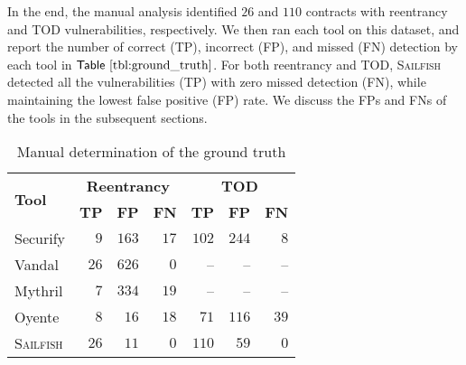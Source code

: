 \documentclass[conference, romanappendices]{tex/IEEEtran}
\theoremstyle{bfnote}
\newcommand{\toolname}{\textsc{Sailfish}\xspace}
\newcommand{\oyente}{{\sc Oyente}\xspace}
\newcommand{\securify}{{\sc Securify}\xspace}
\newcommand{\vandal}{{\sc Vandal}\xspace}
\newcommand{\reentrancy}{{reentrancy}\xspace}
\newcommand{\mythril}{{\sc Mythril}\xspace}
\newcommand{\Tbl}[1]{\ensuremath{\sf Table~\ref{#1}}}
\newcommand{\groundTruthDAO}{26}
\newcommand{\groundTruthTOD}{110}
\newcommand{\securifyTPDAO}{9}
\newcommand{\securifyFPDAO}{163}
\newcommand{\securifyFNDAO}{17}
\newcommand{\securifyTPTOD}{102}
\newcommand{\securifyFPTOD}{244}
\newcommand{\securifyFNTOD}{8}
\newcommand{\vandalTPDAO}{26}
\newcommand{\vandalFPDAO}{626}
\newcommand{\vandalFNDAO}{0}
\newcommand{\vandalTPTOD}{--}
\newcommand{\vandalFPTOD}{--}
\newcommand{\vandalFNTOD}{--}
\newcommand{\mythrilTPDAO}{7}
\newcommand{\mythrilFPDAO}{334}
\newcommand{\mythrilFNDAO}{19}
\newcommand{\mythrilTPTOD}{--}
\newcommand{\mythrilFPTOD}{--}
\newcommand{\mythrilFNTOD}{--}
\newcommand{\oyenteTPDAO}{8}
\newcommand{\oyenteFPDAO}{16}
\newcommand{\oyenteFNDAO}{18}
\newcommand{\oyenteTPTOD}{71}
\newcommand{\oyenteFPTOD}{116}
\newcommand{\oyenteFNTOD}{39}
\newcommand{\clintTPDAO}{26}
\newcommand{\clintFPDAO}{11}
\newcommand{\clintFNDAO}{0}
\newcommand{\clintTPTOD}{110}
\newcommand{\clintFPTOD}{59}
\newcommand{\clintFNTOD}{0}
\begin{document}
In the end, the manual analysis identified $\groundTruthDAO$ and $\groundTruthTOD$ contracts with \reentrancy and {TOD\EndAccSupp{}} vulnerabilities, respectively.
We then ran each tool on this dataset, and report the number of correct (TP), incorrect (FP), and missed (FN) detection by each tool in \Tbl{tbl:ground_truth}.
For both \reentrancy and {TOD\EndAccSupp{}}, \toolname detected all the vulnerabilities (TP) with zero missed detection (FN), while maintaining the lowest false positive (FP) rate.
We discuss the FPs and FNs of the tools in the subsequent sections.


\begin{table}[t]
	\centering
	\scriptsize
	\begin{tabular}{l|rrr|rrr}
		\toprule
		\multirow{2}{*}{\textbf{Tool}} & \multicolumn{3}{c|}{\textbf{Reentrancy}} & \multicolumn{3}{c}{\textbf{TOD}} \\ 
		\cline{2-7} 
		& \multicolumn{1}{c}{\textbf{TP}}& \textbf{FP} & \multicolumn{1}{c|}{\textbf{FN}} 
		& \multicolumn{1}{c}{\textbf{TP}} & \multicolumn{1}{c}{\textbf{FP}} & \multicolumn{1}{c}{\textbf{FN}} \\ 
		\midrule
		\rowcolor{black!10}	\securify & $\securifyTPDAO$ & $\securifyFPDAO$ & $\securifyFNDAO$ & $\securifyTPTOD$ & $\securifyFPTOD$ & $\securifyFNTOD$ \\
		\vandal & $\vandalTPDAO$ & $\vandalFPDAO$ & $\vandalFNDAO$ & \vandalTPTOD & \vandalFPTOD & \vandalFNTOD \\
		\rowcolor{black!10} \mythril & $\mythrilTPDAO$ & $\mythrilFPDAO$ & $\mythrilFNDAO$ & \mythrilTPTOD & \mythrilFPTOD & \mythrilFNTOD \\
		\oyente & $\oyenteTPDAO$ & $\oyenteFPDAO$ & $\oyenteFNDAO$ & $\oyenteTPTOD$ & $\oyenteFPTOD$ & $\oyenteFNTOD$ \\
		\rowcolor{black!10} \toolname & $\clintTPDAO$ & $\clintFPDAO$ & $\clintFNDAO$ & $\clintTPTOD$ & $\clintFPTOD$ & $\clintFNTOD$ \\
		\bottomrule
	\end{tabular}
	\vspace{-1mm}
	\caption{\small Manual determination of the ground truth}
	\label{tbl:ground_truth}
	\vspace{-6.5mm}
\end{table}
\end{document}
